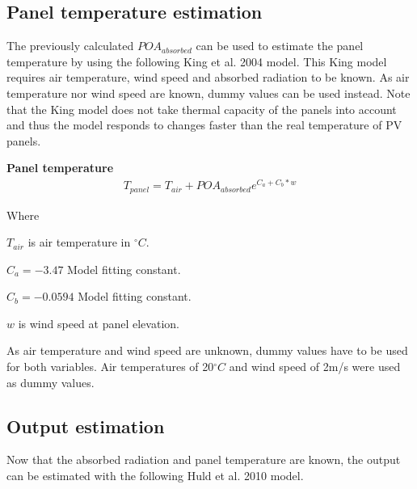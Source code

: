 \newpage
\subsection{Panel temperature estimation}
The previously calculated $POA_{absorbed}$ can be used to estimate the panel temperature by using the following King et al. 2004 model\cite{king2004}. This King model requires air temperature, wind speed and absorbed radiation to be known. As air temperature nor wind speed are known, dummy values can be used instead. Note that the King model does not take thermal capacity of the panels into account and thus the model responds to changes faster than the real temperature of PV panels. 


\noindent\textbf{Panel temperature}
\begin{equation}
\begin{split}
\label{panel_temp}
T_{panel} = T_{air} + POA_{absorbed} e ^{C_a+ C_b*w}
\end{split}
\end{equation}

\noindent Where 

$T_{air}$ is air temperature in $^\circ C$.

$C_a = -3.47$ Model fitting constant.

$C_b = -0.0594$ Model fitting constant. 

$w$ is wind speed at panel elevation.


\vspace{6mm}

\noindent As air temperature and wind speed are unknown, dummy values have to be used for both variables. Air temperatures of 20$^\circ C$ and wind speed of 2m/s were used as dummy values.

\newpage
\subsection{Output estimation}
Now that the absorbed radiation and panel temperature are known, the output can be estimated with the following Huld et al. 2010 model\cite{huld2010}.

